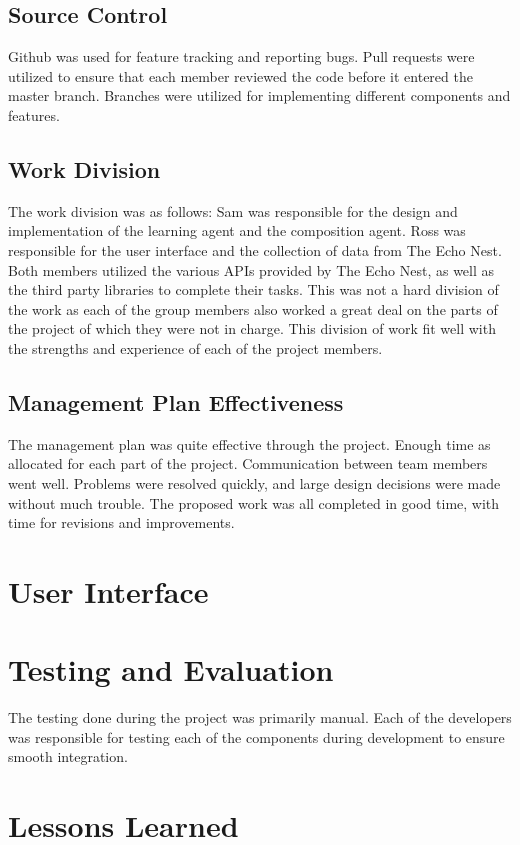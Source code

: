 \documentclass{article}
\begin{document}
\subsection{Source Control}
 Github was used for feature tracking and reporting bugs.  Pull requests were utilized to
 ensure that each member reviewed the code before it entered the master branch.  Branches 
 were utilized for implementing different components and features.

\subsection{Work Division}
The work division was as follows: Sam was responsible for the design and implementation of the learning agent and the composition agent. Ross was responsible for the user interface and the collection of data from The Echo Nest. Both members utilized the various APIs provided by The Echo Nest, as well as the third party libraries to complete their tasks. This was not a hard division of the work as each of the group members also worked a great deal on the parts of the project of which they were not in charge. This division of work fit well with the strengths and experience of each of the project members.

\subsection{Management Plan Effectiveness}
The management plan was quite effective through the project. Enough time as allocated for each part of the project. Communication between team members went well. Problems were resolved quickly, and large design decisions were made without much trouble. The proposed work was all completed in good time, with time for revisions and improvements.

\section{User Interface}


\section{Testing and Evaluation}
The testing done during the project was primarily manual. Each of the developers was responsible for testing each of the components during development to ensure smooth integration.

\section{Lessons Learned}
\end{document}
